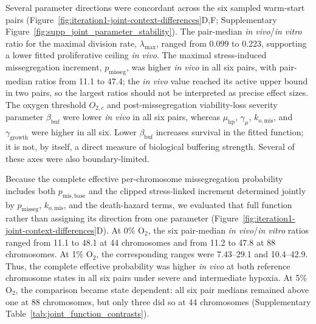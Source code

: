 \documentclass[11pt]{article}
\begin{document}
Several parameter directions were concordant across the six sampled warm-start pairs (Figure~\ref{fig:iteration1-joint-context-differences}D,F; Supplementary Figure~\ref{fig:supp_joint_parameter_stability}). The pair-median \textit{in vivo}/\textit{in vitro} ratio for the maximal division rate, \(\lambda_{\max}\), ranged from 0.099 to 0.223, supporting a lower fitted proliferative ceiling \textit{in vivo}. The maximal stress-induced missegregation increment, \(p_{\mathrm{misseg}}\), was higher \textit{in vivo} in all six pairs, with pair-median ratios from 11.1 to 47.4; the \textit{in vivo} value reached its active upper bound in two pairs, so the largest ratios should not be interpreted as precise effect sizes. The oxygen threshold \(O_{2,c}\) and post-missegregation viability-loss severity parameter \(\beta_{\mathrm{buf}}\) were lower \textit{in vivo} in all six pairs, whereas \(\mu_{\mathrm{hp}}\), \(\gamma_\mu\), \(k_{o,\mathrm{mis}}\), and \(\gamma_{\mathrm{growth}}\) were higher in all six. Lower \(\beta_{\mathrm{buf}}\) increases survival in the fitted function; it is not, by itself, a direct measure of biological buffering strength. Several of these axes were also boundary-limited.

Because the complete effective per-chromosome missegregation probability includes both \(p_{\mathrm{mis,base}}\) and the clipped stress-linked increment determined jointly by \(p_{\mathrm{misseg}}\), \(k_{o,\mathrm{mis}}\), and the death-hazard terms, we evaluated that full function rather than assigning its direction from one parameter (Figure~\ref{fig:iteration1-joint-context-differences}D). At 0\% O$_2$, the six pair-median \textit{in vivo}/\textit{in vitro} ratios ranged from 11.1 to 48.1 at 44 chromosomes and from 11.2 to 47.8 at 88 chromosomes. At 1\% O$_2$, the corresponding ranges were 7.43--29.1 and 10.4--42.9. Thus, the complete effective probability was higher \textit{in vivo} at both reference chromosome states in all six pairs under severe and intermediate hypoxia. At 5\% O$_2$, the comparison became state dependent: all six pair medians remained above one at 88 chromosomes, but only three did so at 44 chromosomes (Supplementary Table~\ref{tab:joint_function_contrasts}).
\end{document}
